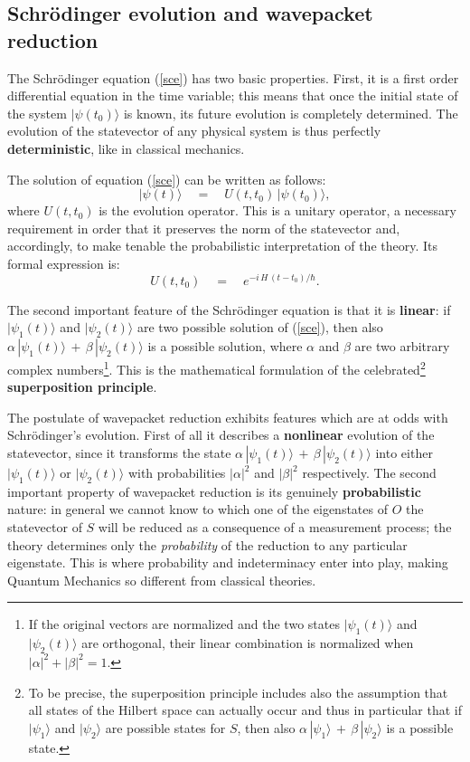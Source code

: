 \documentclass[10pt,a4paper]{article}
\begin{document}
\subsection{Schr\"odinger evolution and wavepacket reduction}
\label{sec12}

The Schr\"odinger equation (\ref{sce}) has two basic properties.
First, it is a first order differential equation in the time
variable; this means that once the initial state of the system
$|\psi(t_{0})\rangle$ is known, its future evolution is completely
determined. The evolution of the statevector of any physical
system is thus perfectly {\bf deterministic}, like in classical
mechanics.

The solution of equation (\ref{sce}) can be written as follows:
\begin{equation}
|\psi(t)\rangle \quad = \quad U(t, t_{0})\, |\psi(t_{0})\rangle,
\end{equation}
where $U(t, t_{0})$ is the evolution operator. This is a unitary
operator, a necessary requirement in order that it preserves the
norm of the statevector and, accordingly, to make tenable the
probabilistic interpretation of the theory. Its formal expression
is:
\begin{equation}
U(t, t_{0}) \quad = \quad e^{\displaystyle -i\, H\,
(t-t_{0})/\hbar}.
\end{equation}

The second important feature of the Schr\"odinger equation is that
it is {\bf linear}: if $|\psi_{1}(t)\rangle$ and
$|\psi_{2}(t)\rangle$ are two possible solution of (\ref{sce}),
then also $\alpha\, |\psi_{1}(t)\rangle \, + \, \beta\,
|\psi_{2}(t)\rangle$ is a possible solution, where $\alpha$ and
$\beta$ are two arbitrary complex numbers\footnote{If the original
vectors are normalized and the two states $|\psi_{1}(t)\rangle$
and $|\psi_{2}(t)\rangle$ are orthogonal, their linear combination
is normalized when $|\alpha|^{2} + |\beta|^{2} = 1$.}. This is the
mathematical formulation of the celebrated\footnote{To be precise,
the superposition principle includes also the assumption that all
states of the Hilbert space can actually occur and thus in
particular that if $|\psi_{1}\rangle$ and $|\psi_{2}\rangle$ are
possible states for $S$, then also $\alpha\, |\psi_{1}\rangle \, +
\, \beta\, |\psi_{2}\rangle$ is a possible state.} {\bf
superposition principle}.

The postulate of  wavepacket reduction exhibits features which are at
odds with Schr\"odinger's evolution. First of all it describes a
{\bf nonlinear} evolution of the statevector, since it transforms
the state $\alpha\, |\psi_{1}(t)\rangle \, + \, \beta\,
|\psi_{2}(t)\rangle$ into either $|\psi_{1}(t)\rangle$ or
$|\psi_{2}(t)\rangle$ with probabilities $|\alpha|^{2}$ and
$|\beta|^{2}$ respectively. The second important property of
wavepacket reduction is its genuinely {\bf probabilistic} nature:
in general we cannot know to which one of the eigenstates of $O$
the statevector of $S$ will be reduced as a consequence of a
measurement process; the theory determines only the {\it
probability} of the reduction to any particular eigenstate. This
is where probability and indeterminacy enter into play, making
Quantum Mechanics so different from classical theories.
\end{document}
